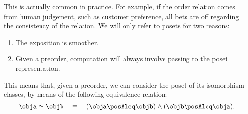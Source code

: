 This is actually common in practice. For example, if the order relation comes from human judgement, such as customer preference, all bets are off regarding the consistency of the relation. We will only refer to posets for two reasons:
\begin{enumerate}
  \item The exposition is smoother.
  \item Given a preorder, computation will always involve passing to the poset representation.
\end{enumerate}
This means that, given a preorder, we can consider the poset of its isomorphism classes, by means of the following equivalence relation:
\begin{equation}
  \obja \simeq \objb \quad \equiv \quad (\obja \posAleq \objb) \wedge (\objb \posAleq \obja).
\end{equation}

